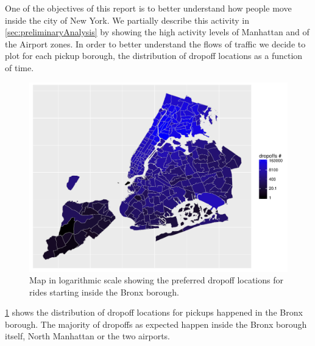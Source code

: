 \documentclass{acm_proc_article-sp-sigmod09}
\begin{document}
One of the objectives of this report is to better understand how people move inside the city of New York. We partially describe this activity in \cref{sec:preliminaryAnalysis} by showing the high activity levels of Manhattan and of the Airport zones. In order to better understand the flows of traffic we decide to plot for each pickup borough, the distribution of dropoff locations as a function of time.

\begin{figure}
	\centering
	\includegraphics[width=1\columnwidth]{resources/base_plots/bronx_dropoff_location_id_dist_map.pdf}
	\caption{Map in logarithmic scale showing the preferred dropoff locations for rides starting inside the Bronx borough.}
	\label{fig:bronxDropoffMap}
\end{figure}

\cref{fig:bronxDropoffMap} shows the distribution of dropoff locations for pickups happened in the Bronx borough. The majority of dropoffs as expected happen inside the Bronx borough itself, North Manhattan or the two airports.
\end{document}
